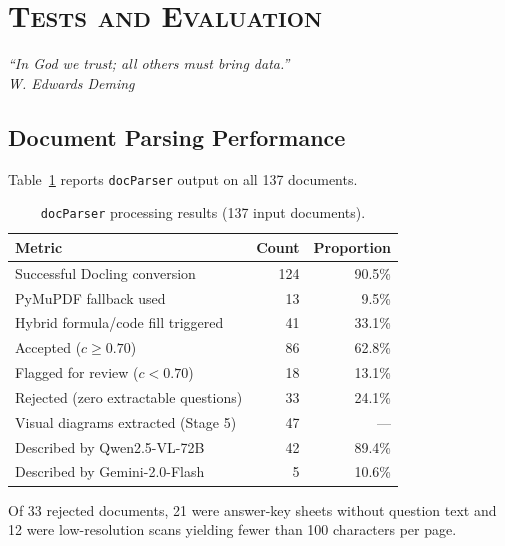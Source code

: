 \newpage
\section{\textsc{Tests and Evaluation}}
\label{chap:results}
\lhead{}
\cfoot{\thepage}
\pagestyle{fancy}
\renewcommand{\headrulewidth}{0.4pt}

\begin{flushright}
\textit{``In God we trust; all others must bring data.''\\
W. Edwards Deming}
\end{flushright}

\subsection{Document Parsing Performance}

Table~\ref{tab:parsing} reports \texttt{docParser} output on all 137 documents.

\begin{table}[H]
\centering
\caption{\texttt{docParser} processing results (137 input documents).}
\label{tab:parsing}
\begin{tabular}{lrr}
\toprule
\textbf{Metric} & \textbf{Count} & \textbf{Proportion} \\
\midrule
Successful Docling conversion              & 124 & 90.5\% \\
PyMuPDF fallback used                      &  13 &  9.5\% \\
Hybrid formula/code fill triggered         &  41 & 33.1\% \\
Accepted ($c \geq 0.70$)                   &  86 & 62.8\% \\
Flagged for review ($c < 0.70$)            &  18 & 13.1\% \\
Rejected (zero extractable questions)      &  33 & 24.1\% \\
\midrule
Visual diagrams extracted (Stage 5)        &  47 &  ---  \\
\quad Described by Qwen2.5-VL-72B          &  42 & 89.4\% \\
\quad Described by Gemini-2.0-Flash        &   5 & 10.6\% \\
\bottomrule
\end{tabular}
\end{table}

Of 33 rejected documents, 21 were answer-key sheets without question text and 12
were low-resolution scans yielding fewer than 100 characters per page.

